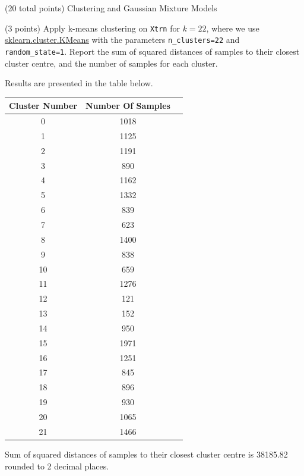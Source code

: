 \documentclass[12pt]{article}
\begin{document}
\begin{question}{(20 total points) Clustering and Gaussian Mixture Models}  


  


  \medskip
   \begin{subquestion}{(3 points)
       Apply k-means clustering on {\tt Xtrn} for $k = 22$, where we use
       \href{https://scikit-learn.org/0.19/modules/generated/sklearn.cluster.KMeans.html}{sklearn.cluster.KMeans}
       with the parameters {\tt n\_clusters=22} and {\tt random\_state=1}.
       Report the sum of squared distances of samples to their closest
       cluster centre, and the number of samples for each cluster.
     } \label{Q3.1}
   

      \begin{answerbox}{35em}
         Results are presented in the table below.
         \begin{center}
         \begin{tabular}{|c|c|c|}
         \hline
         Cluster Number & Number Of Samples \\
         \hline
         0 & 1018 \\
         1 & 1125 \\
         2 & 1191 \\
         3 & 890 \\
         4 & 1162 \\
         5 & 1332 \\
         6 & 839 \\
         7 & 623 \\
         8 & 1400 \\
         9 & 838 \\
         10 & 659 \\
         11 & 1276 \\
         12 & 121 \\
         13 & 152 \\
         14 & 950 \\
         15 & 1971 \\
         16 & 1251 \\
         17 & 845 \\
         18 & 896 \\
         19 & 930 \\
         20 & 1065 \\
         21 & 1466 \\
         \hline
         \end{tabular}
         \end{center}
         Sum of squared distances of samples to their closest cluster centre is 38185.82 rounded to 2 decimal places.
      \end{answerbox}
  



\end{subquestion}
\end{question}
\end{document}
